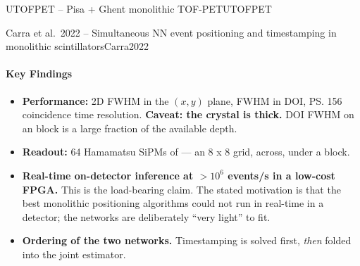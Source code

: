 \begin{programnote}{UTOFPET -- Pisa + Ghent monolithic TOF-PET}{UTOFPET}
\begin{papernote}{Carra et al.\ 2022 -- Simultaneous NN event positioning and timestamping in monolithic scintillators}{Carra2022}
\paragraph{Key Findings}
\begin{itemize}
	\item \textbf{Performance:}  2D FWHM in the $(x,y)$ plane,
		 FWHM in DOI, \ps{156} coincidence time resolution.
		\textbf{Caveat: the crystal is  thick.}  DOI
		FWHM on an  block is a large fraction of the available depth.
	\item \textbf{Readout:} 64 Hamamatsu SiPMs of
		 --- an 8 x 8 grid,
		 across, under a  block.
	\item \textbf{Real-time on-detector inference at $>10^{6}$ events/s in a
		low-cost FPGA.} This is the load-bearing claim. The stated motivation is
		that the best monolithic positioning algorithms could not run in
		real-time in a detector; the networks are deliberately ``very light'' to
		fit. 
	\item \textbf{Ordering of the two networks.} Timestamping is solved first,
		\emph{then} folded into the joint estimator. 
\end{itemize}


\end{papernote}
\end{programnote}
